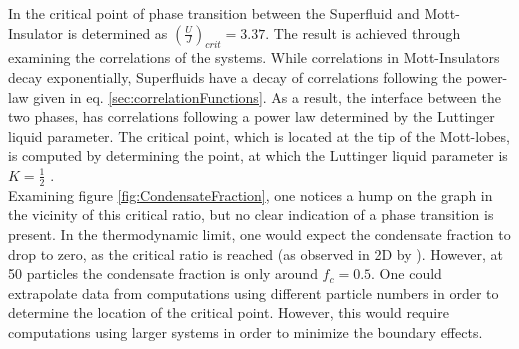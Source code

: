 In \cite{Kuhner2000} the critical point of phase transition between the Superfluid and Mott-Insulator is determined as $\left( \frac{U}{J} \right)_{crit} = 3.37$. The result is achieved through examining the correlations of the systems. While correlations in Mott-Insulators decay exponentially, Superfluids have a decay of correlations following the power-law given in eq. \eqref{sec:correlationFunctions}. As a result, the interface between the two phases, has correlations following a power law determined by the Luttinger liquid parameter. The critical point, which is located at the tip of the Mott-lobes, is computed by determining the point, at which the Luttinger liquid parameter is $K =  \frac{1}{2}$ \cite{Kuhner2000}.\\
Examining figure \ref{fig:CondensateFraction}, one notices a hump on the graph in the vicinity of this critical ratio, but no clear indication of a phase transition is present. In the thermodynamic limit, one would expect the condensate fraction to drop to zero, as the critical ratio is reached (as observed in 2D by \cite{Spielman2008}). However, at 50 particles the condensate fraction is only around $ f_c = 0.5$. One could extrapolate data from computations using different particle numbers in order to determine the location of the critical point. However, this would require computations using larger systems in order to minimize the boundary effects.